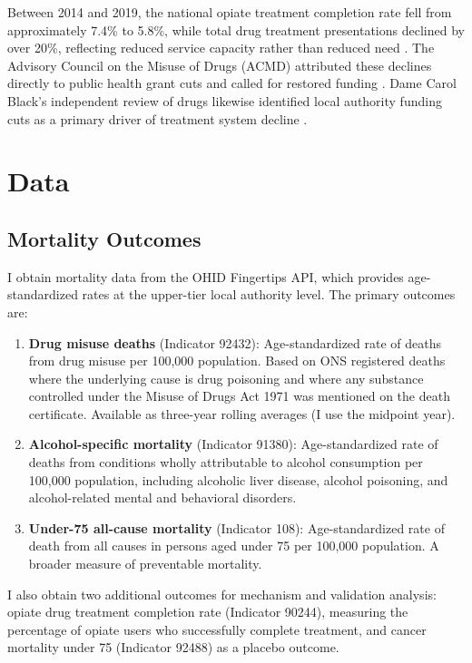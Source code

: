 \documentclass[12pt]{article}
\begin{document}
Between 2014 and 2019, the national opiate treatment completion rate fell from approximately 7.4\% to 5.8\%, while total drug treatment presentations declined by over 20\%, reflecting reduced service capacity rather than reduced need \citep{phe2019}. The Advisory Council on the Misuse of Drugs (ACMD) attributed these declines directly to public health grant cuts and called for restored funding \citep{acmd2016}. Dame Carol Black's independent review of drugs likewise identified local authority funding cuts as a primary driver of treatment system decline \citep{black2020}.


\section{Data}

\subsection{Mortality Outcomes}

I obtain mortality data from the OHID Fingertips API, which provides age-standardized rates at the upper-tier local authority level. The primary outcomes are:

\begin{enumerate}
    \item \textbf{Drug misuse deaths} (Indicator 92432): Age-standardized rate of deaths from drug misuse per 100,000 population. Based on ONS registered deaths where the underlying cause is drug poisoning and where any substance controlled under the Misuse of Drugs Act 1971 was mentioned on the death certificate. Available as three-year rolling averages (I use the midpoint year).

    \item \textbf{Alcohol-specific mortality} (Indicator 91380): Age-standardized rate of deaths from conditions wholly attributable to alcohol consumption per 100,000 population, including alcoholic liver disease, alcohol poisoning, and alcohol-related mental and behavioral disorders.

    \item \textbf{Under-75 all-cause mortality} (Indicator 108): Age-standardized rate of death from all causes in persons aged under 75 per 100,000 population. A broader measure of preventable mortality.
\end{enumerate}

I also obtain two additional outcomes for mechanism and validation analysis: opiate drug treatment completion rate (Indicator 90244), measuring the percentage of opiate users who successfully complete treatment, and cancer mortality under 75 (Indicator 92488) as a placebo outcome.
\end{document}
